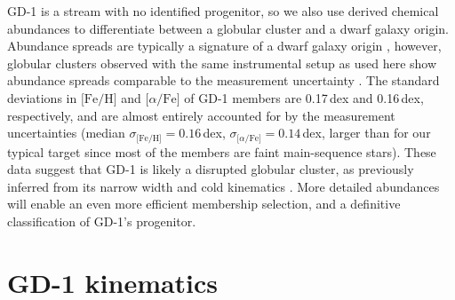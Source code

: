 \documentclass[twocolumn]{aastex63}
\newcommand{\feh}{\ensuremath{\textrm{[Fe/H]}}}
\newcommand{\afe}{\ensuremath{\textrm{[$\alpha$/Fe]}}}
\begin{document}
GD-1 is a stream with no identified progenitor, so we also use derived chemical abundances to differentiate between a globular cluster and a dwarf galaxy origin.
Abundance spreads are typically a signature of a dwarf galaxy origin \citep[e.g.,][]{willman2012}, however, globular clusters observed with the same instrumental setup as used here show abundance spreads comparable to the measurement uncertainty \citep[$\approx0.05-0.1$\,dex,][]{cargile2019}.
The standard deviations in $\feh$ and $\afe$ of GD-1 members are 0.17\,dex and 0.16\,dex, respectively, and are almost entirely accounted for by the measurement uncertainties (median $\sigma_\feh=0.16$\,dex, $\sigma_\afe=0.14$\,dex, larger than for our typical target since most of the members are faint main-sequence stars).
These data suggest that GD-1 is likely a disrupted globular cluster, as previously inferred from its narrow width \citep[e.g.,][]{grillmair2006} and cold kinematics \citep[e.g.,][]{malhan2019}.
More detailed abundances will enable an even more efficient membership selection, and a definitive classification of GD-1's progenitor.


\section{GD-1 kinematics}
\label{sec:kinematics}
\end{document}
